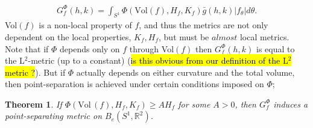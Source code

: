 \documentclass[a4,danish]{article}
\theoremstyle{break}
\newtheorem{theorem}[subsection]{Theorem}
\theoremstyle{definition}
\theoremstyle{Break}
\newcommand{\R}{\mathbb{R}}
\begin{document}
\begin{align*}
G_f^\Phi (h,k) = \int_{S^1} \Phi(\text{Vol}(f), H_f, K_f) \bar{g}(h,k) \left| f_\theta \right| d \theta.
\end{align*}
Vol$(f)$ is a non-local property of $f$, and thus the metrics are not only dependent on the local properties, $K_f, H_f$, but must be $\textit{almost}$ local metrics. \\[0.2 cm]
Note that if $\Phi$ depends only on $f$ through Vol$(f)$ then $G_f^\Phi (h,k)$ is equal to the L$^2$-metric (up to a constant) (\hl{is this obvious from our definition of the L$^2$ metric ?}). But if $\Phi$ actually depends on either curvature and the total volume, then point-separation is achieved under certain conditions imposed on $\Phi$;

\begin{theorem}\label{point_sep}
If $\Phi(\text{Vol} \, (f), H_f, K_f) \geq A H_f$ for some $A > 0$, then $G_f^\Phi$ induces a point-separating metric on $B_e(S^1, \R^2)$.
\end{theorem}
\end{document}
